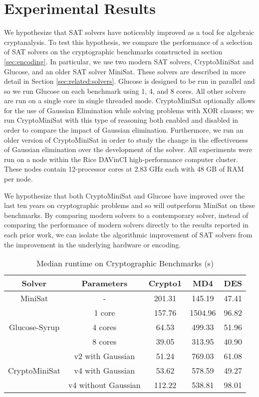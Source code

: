 \section{Experimental Results}
\label{sec:results}

We hypothesize that SAT solvers have noticeably improved as a tool for algebraic cryptanalysis. To test this hypothesis, we compare the performance of a selection of SAT solvers on the cryptographic benchmarks constructed in section \ref{sec:encoding}. In particular, we use two modern SAT solvers, CryptoMiniSat and Glucose, and an older SAT solver MiniSat. These solvers are described in more detail in Section \ref{sec:related:solvers}. Glucose is designed to be run in parallel and so we run Glucose on each benchmark using 1, 4, and 8 cores. All other solvers are run on a single core in single threaded mode. CryptoMiniSat optionally allows for the use of Gaussian Elimination while solving problems with XOR clauses; we run CryptoMiniSat with this type of reasoning both enabled and disabled in order to compare the impact of Gaussian elimination. Furthermore, we run an older version of CryptoMiniSat in order to study the change in the effectiveness of Gaussian elimination over the development of the solver. All experiments were run on a node within the Rice DAVinCI high-performance computer cluster. These nodes contain 12-processor cores at 2.83 GHz each with 48 GB of RAM per node.

We hypothesize that both CryptoMiniSat and Glucose have improved over the last ten years on cryptographic problems and so will outperform MiniSat on these benchmarks. By comparing modern solvers to a contemporary solver, instead of comparing the performance of modern solvers directly to the results reported in each prior work, we can isolate the algorithmic improvement of SAT solvers from the improvement in the underlying hardware or encoding.

\begin{table}[!htbp]
	\centering
	\begin{tabular}{|c|c|c|c|c|}
		\hline
		\textbf{Solver} & \textbf{Parameters} & \textbf{Crypto1} & \textbf{MD4} & \textbf{DES}\\
		\hline
		MiniSat & - & 201.31 & 145.19 & 47.41\\
		\hline
		\multirow{3}{*}{Glucose-Syrup} & 1 core & 157.76 & 1504.96 & 96.82 \\ \cline{2-5}
		& 4 cores & 64.53 & 499.33 & 51.96 \\ \cline{2-5}
		& 8 cores & 39.05 & 313.95 & 40.90 \\
		\hline
		
		\multirow{3}{*}{CryptoMiniSat} & v2 with Gaussian & 51.24 & 769.03 & 61.08 \\ \cline{2-5}
		& v4 with Gaussian & 53.62 & 578.59 & 49.27 \\ \cline{2-5}
		& v4 without Gaussian & 112.22 & 538.81 & 98.01 \\
		\hline
	\end{tabular}
	
	\caption{Median runtime on Cryptographic Benchmarks (s)}
	\label{table:all:runtime}
\end{table}

